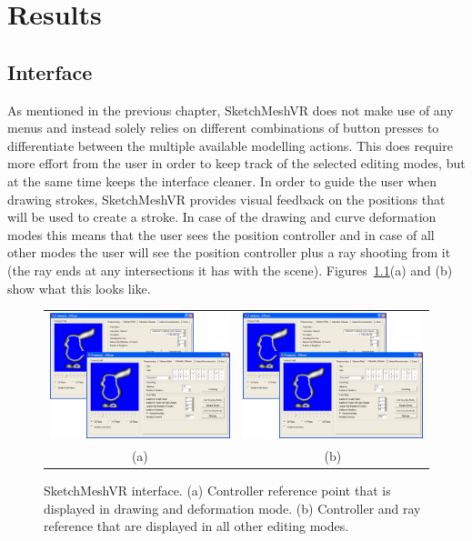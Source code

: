 \chapter{Results}
\label{chap:results}

\section{Interface}
As mentioned in the previous chapter, SketchMeshVR does not make use of any menus and instead solely relies on different combinations of button presses to differentiate between the multiple available modelling actions. This does require more effort from the user in order to keep track of the selected editing modes, but at the same time keeps the interface cleaner. In order to guide the user when drawing strokes, SketchMeshVR provides visual feedback on the positions that will be used to create a stroke. In case of the drawing and curve deformation modes this means that the user sees the position controller and in case of all other modes the user will see the position controller plus a ray shooting from it (the ray ends at any intersections it has with the scene). Figures~\ref{fig:interface}(a) and (b) show what this looks like.

\begin{figure}[!h]
    \centering
    \setlength{\tabcolsep}{0.0130\linewidth}
    \begin{tabular}{@{}cc@{}}
    \includegraphics[width=0.3\linewidth]{figures/voldiff_ui}&
  	\includegraphics[width=0.3\linewidth]{figures/voldiff_ui}\\
    (a)&(b)\\
    \end{tabular}
    \caption[SketchMeshVR interface]{SketchMeshVR interface.
    	  \textup{(a)} Controller reference point that is displayed in drawing and deformation mode.
			  \textup{(b)} Controller and ray reference that are displayed in all other editing modes. 
      \label{fig:interface}}
\end{figure}
 
